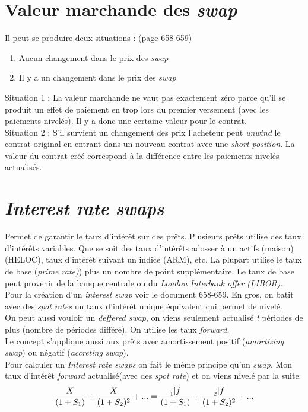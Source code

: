 \documentclass[11pt,french]{report}
\newcommand{\indiceGauche}[2]{{\vphantom{#2}}_{#1}#2}
\begin{document}
\section{Valeur marchande des \emph{swap}}
\label{swap price}

Il peut se produire deux situations : (page 658-659)
\begin{enumerate}
\item Aucun changement dans le prix des \emph{swap}
\item Il y a un changement dans le prix des \emph{swap}
\end{enumerate}

Situation 1 : La valeur marchande ne vaut pas exactement zéro parce qu'il se produit un effet de paiement en trop lors du premier versement (avec les paiements nivelés). Il y a donc une certaine valeur pour le contrat.
\\
Situation 2 : 
S'il survient un changement des prix l'acheteur peut \emph{unwind} le contrat original en entrant dans un nouveau contrat avec une \emph{short position}. La valeur du contrat créé correspond à la différence entre les paiements nivelés actualisés.

\section{\emph{Interest rate swaps}}
\label{sec:interest rate swap}

Permet de garantir le taux d'intérêt sur des prêts. Plusieurs prêts utilise des taux d'intérêts variables. Que se soit des taux d'intérêts adosser à un actifs (maison)(HELOC), taux d'intérêt suivant un indice (ARM), etc. La plupart utilise le taux de base (\emph{prime rate)}) plus un nombre de point supplémentaire. Le taux de base peut provenir de la banque centrale ou du \emph{London Interbank offer (LIBOR)}. 
\\ Pour la création d'un \emph{interest swap} voir le document 658-659. En gros, on batit avec des \emph{spot rates} un taux d'intérêt unique équivalent qui permet de nivelé. 
\\ On peut aussi vouloir un \emph{deffered swap}, on viens seulement actualisé \textit{t} périodes de plus (nombre de périodes différé). On utilise les taux \emph{forward}.
\\ Le concept s'applique aussi aux prêts avec amortissement positif (\emph{amortizing swap}) ou négatif (\emph{accreting swap}).
\\
Pour calculer un \emph{Interest rate swaps} on fait le même principe qu'un \emph{swap}. Mon taux d'intérêt \emph{forward} actualisé(avec des \emph{spot rate}) et on viens nivelé par la suite.
\begin{equation}
\frac{X}{(1+S_1)} + \frac{X}{(1+S_2)^2} + ... = \frac{\indiceGauche{1}{\vert}f}{(1+S_1)} + \frac{\indiceGauche{2}{\vert}f}{(1+S_2)^2} + ...
\end{equation}
\end{document}
